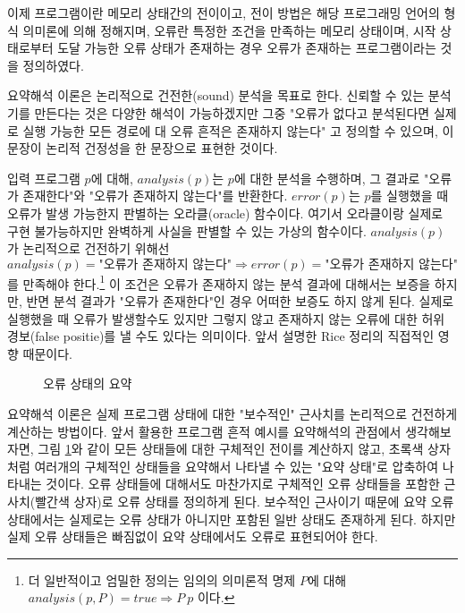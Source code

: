 \documentclass[a4paper,12pt]{article}
\begin{document}
이제 프로그램이란 메모리 상태간의 전이이고, 전이 방법은 해당 프로그래밍 언어의 형식 의미론에 의해 정해지며, 오류란 특정한 조건을 만족하는 메모리 상태이며, 
시작 상태로부터 도달 가능한 오류 상태가 존재하는 경우 오류가 존재하는 프로그램이라는 것을 정의하였다.

요약해석 이론은 논리적으로 건전한(sound) 분석을 목표로 한다. 신뢰할 수 있는 분석기를 만든다는 것은 다양한 해석이 가능하겠지만 그중 "오류가 없다고 분석된다면 실제로 실행 가능한 모든 경로에 대 오류 흔적은 존재하지 않는다" 고 정의할 수 있으며,
이 문장이 논리적 건정성을 한 문장으로 표현한 것이다.

입력 프로그램 $p$에 대해, $analysis(p)$는 $p$에 대한 분석을 수행하며, 그 결과로 "오류가 존재한다"와 "오류가 존재하지 않는다"를 반환한다.
$error(p)$는 $p$를 실행했을 때 오류가 발생 가능한지 판별하는 오라클(oracle) 함수이다. 여기서 오라클이랑 실제로 구현 불가능하지만 완벽하게 사실을 판별할 수 있는 가상의 함수이다.
$analysis(p)$ 가 논리적으로 건전하기 위해선
\begin{equation}
    analysis(p) = \text{"오류가 존재하지 않는다"} \Rightarrow error(p) = \text{"오류가 존재하지 않는다"}
\end{equation}
를 만족해야 한다.\footnote{더 일반적이고 엄밀한 정의는 임의의 의미론적 명제 $P$에 대해 $analysis(p, P) = true \Rightarrow P \ p$ 이다.} 이 조건은 오류가 존재하지 않는 분석 결과에 대해서는 보증을 하지만, 반면 분석 결과가 "오류가 존재한다"인 경우 어떠한 보증도 하지 않게 된다.
실제로 실행했을 때 오류가 발생할수도 있지만 그렇지 않고 존재하지 않는 오류에 대한 허위 경보(false positie)를 낼 수도 있다는 의미이다. 앞서 설명한 Rice 정리의 직접적인 영향 때문이다.

\begin{figure}[h]
    \centering
    
    \caption{오류 상태의 요약}
    \label{fig:trace_error_abstraction}
\end{figure}

요약해석 이론은 실제 프로그램 상태에 대한 "보수적인" 근사치를 논리적으로 건전하게 계산하는 방법이다. 
앞서 활용한 프로그램 흔적 예시를 요약해석의 관점에서 생각해보자면, 그림 \ref{fig:trace_error_abstraction}와 같이 모든 상태들에 대한 구체적인 전이를 계산하지 않고, 초록색 상자처럼 여러개의 구체적인 상태들을 요약해서 나타낼 수 있는 "요약 상태"로 압축하여 나타내는 것이다.
오류 상태들에 대해서도 마찬가지로 구체적인 오류 상태들을 포함한 근사치(빨간색 상자)로 오류 상태를 정의하게 된다. 보수적인 근사이기 때문에 요약 오류 상태에서는 실제로는 오류 상태가 아니지만 포함된 일반 상태도 존재하게 된다. 하지만 실제 오류 상태들은 빠짐없이 요약 상태에서도 오류로 표현되어야 한다.
\end{document}
